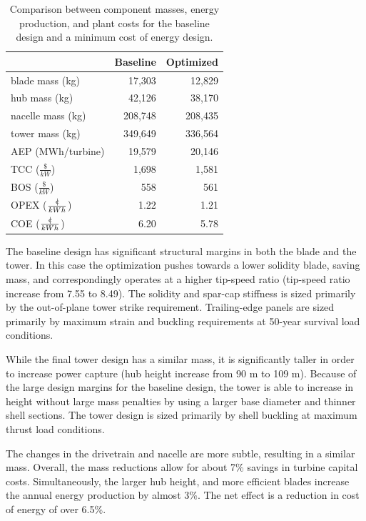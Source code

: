 \documentclass[]{aiaa-tc} %
\newcommand{\cent}{{\mathrm{c}\mkern-6.5mu{\mid}}}
\begin{document}
    \begin{table}[htb]
    \centering
    \caption{Comparison between component masses, energy production, and plant costs for the baseline design and a minimum cost of energy design.}
    \label{tab:wind_results}
    \begin{tabular}{@{}lrr@{}}
    \toprule
     &  Baseline & Optimized  \\
    \midrule
    blade mass (kg) & 17,303 & 12,829  \\
    hub mass (kg) & 42,126 & 38,170  \\
    nacelle mass (kg) & 208,748 & 208,435  \\
    tower mass (kg) & 349,649 & 336,564  \\
    AEP (MWh/turbine) &  19,579 & 20,146  \\
    TCC ($\frac{\$}{kW}$) &  1,698 & 1,581  \\
    BOS ($\frac{\$}{kW}$) &  558 & 561  \\
    OPEX ($\frac{\cent}{kWh}$) &  1.22 & 1.21  \\
    COE ($\frac{\cent}{kWh}$) &  6.20 & 5.78  \\
    \bottomrule
    \end{tabular}
    \end{table}

      The baseline design has significant structural margins in both the blade and the tower.  In this case the optimization pushes towards a lower solidity blade, saving mass, and correspondingly operates at a higher tip-speed ratio (tip-speed ratio increase from 7.55 to 8.49).  The solidity and spar-cap stiffness is sized primarily by the out-of-plane tower strike requirement.  Trailing-edge panels are sized primarily by maximum strain and buckling requirements at 50-year survival load conditions.

      While the final tower design has a similar mass, it is significantly taller in order to increase power capture (hub height increase from 90 m to 109 m).  Because of the large design margins for the baseline design, the tower is able to increase in height without large mass penalties by using a larger base diameter and thinner shell sections.  The tower design is sized primarily by shell buckling at maximum thrust load conditions.

      The changes in the drivetrain and nacelle are more subtle, resulting in a similar mass.  Overall, the mass reductions allow for about 7\% savings in turbine capital costs.  Simultaneously, the larger hub height, and more efficient blades increase the annual energy production by almost 3\%.  The net effect is a reduction in cost of energy of over 6.5\%.
        
\end{document}
